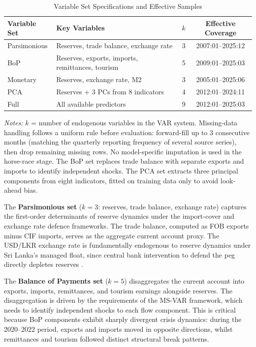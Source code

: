 \documentclass[12pt,a4paper]{article}
\begin{document}
\begin{table}[htbp]
\centering
\caption{Variable Set Specifications and Effective Samples}
\label{tab:varsets}
\begin{tabular}{llcc}
\toprule
Variable Set & Key Variables & $k$ & Effective Coverage \\
\midrule
Parsimonious & Reserves, trade balance, exchange rate & 3 & 2007:01--2025:12 \\
BoP & Reserves, exports, imports, remittances, tourism & 5 & 2009:01--2025:03 \\
Monetary & Reserves, exchange rate, M2 & 3 & 2005:01--2025:06 \\
PCA & Reserves + 3 PCs from 8 indicators & 4 & 2012:01--2024:11 \\
Full & All available predictors & 9 & 2012:01--2025:03 \\
\bottomrule
\end{tabular}
\begin{tablenotes}
\small
\item \textit{Notes:} $k$ = number of endogenous variables in the VAR system. Missing-data handling follows a uniform rule before evaluation: forward-fill up to 3 consecutive months (matching the quarterly reporting frequency of several source series), then drop remaining missing rows. No model-specific imputation is used in the horse-race stage. The BoP set replaces trade balance with separate exports and imports to identify independent shocks. The PCA set extracts three principal components from eight indicators, fitted on training data only to avoid look-ahead bias.
\end{tablenotes}
\end{table}

The \textbf{Parsimonious set} ($k=3$: reserves, trade balance, exchange rate) captures the first-order determinants of reserve dynamics under the import-cover and exchange rate defence frameworks. The trade balance, computed as FOB exports minus CIF imports, serves as the aggregate current account proxy. The USD/LKR exchange rate is fundamentally endogenous to reserve dynamics under Sri Lanka's managed float, since central bank intervention to defend the peg directly depletes reserves \citep{Obstfeld2010}.

The \textbf{Balance of Payments set} ($k=5$) disaggregates the current account into exports, imports, remittances, and tourism earnings alongside reserves. The disaggregation is driven by the requirements of the MS-VAR framework, which needs to identify independent shocks to each flow component. This is critical because BoP components exhibit sharply divergent crisis dynamics: during the 2020--2022 period, exports and imports moved in opposite directions, whilst remittances and tourism followed distinct structural break patterns.
\end{document}
